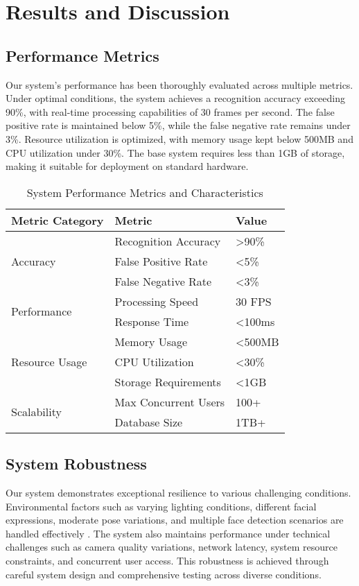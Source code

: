 \documentclass[conference]{IEEEtran}
\begin{document}
\section{Results and Discussion}

\subsection{Performance Metrics}
Our system's performance has been thoroughly evaluated across multiple metrics. Under optimal conditions, the system achieves a recognition accuracy exceeding 90\%, with real-time processing capabilities of 30 frames per second. The false positive rate is maintained below 5\%, while the false negative rate remains under 3\%. Resource utilization is optimized, with memory usage kept below 500MB and CPU utilization under 30\%. The base system requires less than 1GB of storage, making it suitable for deployment on standard hardware.

\begin{table}[h]
\centering
\caption{System Performance Metrics and Characteristics}
\begin{tabular}{lll}
\toprule
Metric Category & Metric & Value \\
\midrule
\multirow{3}{*}{Accuracy} & Recognition Accuracy & >90\% \\
& False Positive Rate & <5\% \\
& False Negative Rate & <3\% \\
\midrule
\multirow{2}{*}{Performance} & Processing Speed & 30 FPS \\
& Response Time & <100ms \\
\midrule
\multirow{3}{*}{Resource Usage} & Memory Usage & <500MB \\
& CPU Utilization & <30\% \\
& Storage Requirements & <1GB \\
\midrule
\multirow{2}{*}{Scalability} & Max Concurrent Users & 100+ \\
& Database Size & 1TB+ \\
\bottomrule
\end{tabular}
\end{table}

\subsection{System Robustness}
Our system demonstrates exceptional resilience to various challenging conditions. Environmental factors such as varying lighting conditions, different facial expressions, moderate pose variations, and multiple face detection scenarios are handled effectively \cite{b10}. The system also maintains performance under technical challenges such as camera quality variations, network latency, system resource constraints, and concurrent user access. This robustness is achieved through careful system design and comprehensive testing across diverse conditions.
\end{document}
